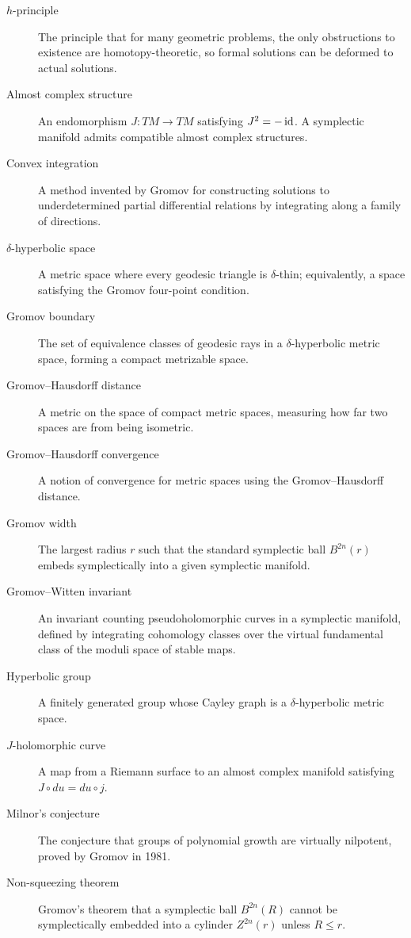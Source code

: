 \begin{description}
    \item[\(h\)-principle] The principle that for many geometric problems, the only obstructions to existence are homotopy-theoretic, so formal solutions can be deformed to actual solutions.
    \item[Almost complex structure] An endomorphism \(J: TM \to TM\) satisfying \(J^2 = -\operatorname{id}\). A symplectic manifold admits compatible almost complex structures.
    \item[Convex integration] A method invented by Gromov for constructing solutions to underdetermined partial differential relations by integrating along a family of directions.
    \item[\(\delta\)-hyperbolic space] A metric space where every geodesic triangle is \(\delta\)-thin; equivalently, a space satisfying the Gromov four-point condition.
    \item[Gromov boundary] The set of equivalence classes of geodesic rays in a \(\delta\)-hyperbolic metric space, forming a compact metrizable space.
    \item[Gromov--Hausdorff distance] A metric on the space of compact metric spaces, measuring how far two spaces are from being isometric.
    \item[Gromov--Hausdorff convergence] A notion of convergence for metric spaces using the Gromov--Hausdorff distance.
    \item[Gromov width] The largest radius \(r\) such that the standard symplectic ball \(B^{2n}(r)\) embeds symplectically into a given symplectic manifold.
    \item[Gromov--Witten invariant] An invariant counting pseudoholomorphic curves in a symplectic manifold, defined by integrating cohomology classes over the virtual fundamental class of the moduli space of stable maps.
    \item[Hyperbolic group] A finitely generated group whose Cayley graph is a \(\delta\)-hyperbolic metric space.
    \item[\(J\)-holomorphic curve] A map from a Riemann surface to an almost complex manifold satisfying \(J \circ du = du \circ j\).
    \item[Milnor's conjecture] The conjecture that groups of polynomial growth are virtually nilpotent, proved by Gromov in 1981.
    \item[Non-squeezing theorem] Gromov's theorem that a symplectic ball \(B^{2n}(R)\) cannot be symplectically embedded into a cylinder \(Z^{2n}(r)\) unless \(R \leq r\).

\end{description}
